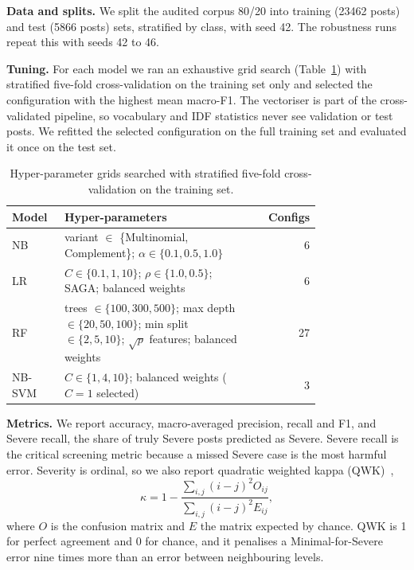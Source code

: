 \documentclass[conference]{IEEEtran}
\begin{document}
\textbf{Data and splits.} We split the audited corpus 80/20 into training (\num{23462} posts) and test (\num{5866} posts) sets, stratified by class, with seed 42. The robustness runs repeat this with seeds 42 to 46.

\textbf{Tuning.} For each model we ran an exhaustive grid search (Table~\ref{tab:grid}) with stratified five-fold cross-validation on the training set only and selected the configuration with the highest mean macro-F1. The vectoriser is part of the cross-validated pipeline, so vocabulary and IDF statistics never see validation or test posts. We refitted the selected configuration on the full training set and evaluated it once on the test set.

\begin{table}[!htbp]
\centering
\caption{Hyper-parameter grids searched with stratified five-fold cross-validation on the training set.}
\label{tab:grid}
\begin{tabular}{p{0.17\linewidth}p{0.6\linewidth}r}
\toprule
Model & Hyper-parameters & Configs \\
\midrule
NB & variant $\in$ \{Multinomial, Complement\}; $\alpha\in\{0.1,0.5,1.0\}$ & 6 \\
LR & $C\in\{0.1,1,10\}$; $\rho\in\{1.0,0.5\}$; SAGA; balanced weights & 6 \\
RF & trees $\in\{100,300,500\}$; max depth $\in\{20,50,100\}$; min split $\in\{2,5,10\}$; $\sqrt{p}$ features; balanced weights & 27 \\
NB-SVM & $C\in\{1,4,10\}$; balanced weights ($C=1$ selected) & 3 \\
\bottomrule
\end{tabular}
\end{table}

\textbf{Metrics.} We report accuracy, macro-averaged precision, recall and F1, and Severe recall, the share of truly Severe posts predicted as Severe. Severe recall is the critical screening metric because a missed Severe case is the most harmful error. Severity is ordinal, so we also report quadratic weighted kappa (QWK)~\cite{cohen1968weighted},
\begin{equation}
\kappa=1-\frac{\sum_{i,j}(i-j)^2 O_{ij}}{\sum_{i,j}(i-j)^2 E_{ij}},
\label{eq:qwk}
\end{equation}
where $O$ is the confusion matrix and $E$ the matrix expected by chance. QWK is 1 for perfect agreement and 0 for chance, and it penalises a Minimal-for-Severe error nine times more than an error between neighbouring levels.
\end{document}
